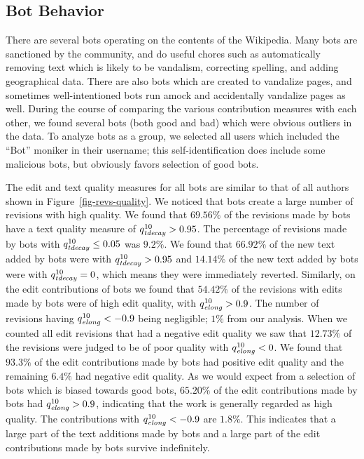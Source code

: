 \subsection{Bot Behavior}

There are several bots operating on the contents of the Wikipedia.
Many bots are sanctioned by the community, and do useful
chores such as automatically removing text which is likely
to be vandalism, correcting spelling, and adding geographical data.
There are also bots which are created to vandalize pages,
and sometimes well-intentioned bots run amock and
accidentally vandalize pages as well.
During the course of comparing the various contribution
measures with each other, we found several bots (both
good and bad) which were obvious outliers in the data.
To analyze bots as a group, we selected all users
which included the ``Bot'' moniker in their username;
this self-identification does include some malicious bots,
but obviously favors selection of good bots.

The edit and text quality measures for all bots are similar to
that of all authors shown in Figure~\ref{fig-revs-quality}.
We noticed that bots create a large number of revisions with
high quality.
We found that $69.56\%$ of the revisions made by
bots have a text quality measure of $\quality{tdecay}{10}{} > 0.95$.
The percentage of revisions made by bots with 
$\quality{tdecay}{10}{} \le 0.05$ was $9.2\%$.
We found that $66.92\%$ of the new text added by bots were with
$\quality{tdecay}{10}{} > 0.95$ and $14.14\%$ of the new text added by
bots were with $\quality{tdecay}{10}{} = 0$, which means they were 
immediately reverted.
Similarly, on the edit contributions of bots we found that
$54.42\%$ of the revisions with edits made by bots were of
high edit quality, with $\quality{elong}{10}{} > 0.9$.
The number of revisions having $\quality{elong}{10}{} < -0.9$ being
negligible; $1\%$ from our analysis.
When we counted all edit revisions that had a negative edit
quality we saw that $12.73\%$ of the revisions were judged to 
be of poor quality with $\quality{elong}{10}{} < 0$.
We found that $93.3\%$ of the edit contributions made by bots
had positive edit quality and the remaining $6.4\%$ had
negative edit quality.
As we would expect from a selection of bots which is biased
towards good bots, $65.20\%$ of the edit contributions made
by bots had $\quality{elong}{10}{} > 0.9$, indicating that
the work is generally regarded as high quality.
The contributions with $\quality{elong}{10}{} < -0.9$ are $1.8\%$.
This indicates that a large part of the text additions made by bots 
and a large part of the edit contributions made by bots survive
indefinitely.

